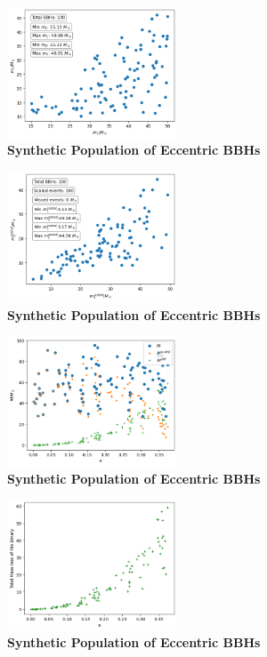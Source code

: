 \documentclass[twocolumn,prd,nofootinbib]{revtex4}
\begin{document}
\begin{figure}
\includegraphics[width=0.45\textwidth]{paper/figures/pop2d038.png}
\caption{\label{fig:population05}\textbf{Synthetic Population of Eccentric BBHs}}
\end{figure}

\begin{figure}
\includegraphics[width=0.45\textwidth]{paper/figures/pop2d038scl.png}
\caption{\label{fig:population05}\textbf{Synthetic Population of Eccentric BBHs}}
\end{figure}
\begin{figure}
\includegraphics[width=0.45\textwidth]{paper/figures/pop2d038diff.png}
\caption{\label{fig:population05}\textbf{Synthetic Population of Eccentric BBHs}}
\end{figure}
\begin{figure}
\includegraphics[width=0.45\textwidth]{paper/figures/massloss038.png}
\caption{\label{fig:population05}\textbf{Synthetic Population of Eccentric BBHs}}
\end{figure}
\end{document}
